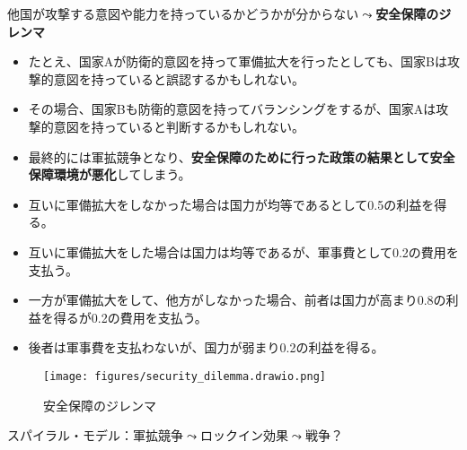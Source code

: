 \documentclass[
  xelatex,
  ja=standard]{bxjsarticle}
\providecommand{\tightlist}{%
  \setlength{\itemsep}{0pt}\setlength{\parskip}{0pt}}\usepackage{longtable,booktabs,array}
\begin{document}
他国が攻撃する意図や能力を持っているかどうかが分からない\(\leadsto\)\textbf{安全保障のジレンマ}\citep{jervis1978}

\begin{itemize}
\tightlist
\item
  たとえ、国家Aが防衛的意図を持って軍備拡大を行ったとしても、国家Bは攻撃的意図を持っていると誤認するかもしれない。
\item
  その場合、国家Bも防衛的意図を持ってバランシングをするが、国家Aは攻撃的意図を持っていると判断するかもしれない。
\item
  最終的には軍拡競争となり、\textbf{安全保障のために行った政策の結果として安全保障環境が悪化}してしまう。
\end{itemize}

\begin{tcolorbox}[enhanced jigsaw, colbacktitle=quarto-callout-tip-color!10!white, breakable, toptitle=1mm, opacitybacktitle=0.6, leftrule=.75mm, bottomrule=.15mm, title=\textcolor{quarto-callout-tip-color}{\faLightbulb}\hspace{0.5em}{安全保障のジレンマ}, titlerule=0mm, bottomtitle=1mm, rightrule=.15mm, arc=.35mm, toprule=.15mm, left=2mm, opacityback=0, coltitle=black, colback=white, colframe=quarto-callout-tip-color-frame]

\begin{itemize}
\tightlist
\item
  互いに軍備拡大をしなかった場合は国力が均等であるとして0.5の利益を得る。
\item
  互いに軍備拡大をした場合は国力は均等であるが、軍事費として0.2の費用を支払う。
\item
  一方が軍備拡大をして、他方がしなかった場合、前者は国力が高まり0.8の利益を得るが0.2の費用を支払う。
\item
  後者は軍事費を支払わないが、国力が弱まり0.2の利益を得る。
\end{itemize}

\end{tcolorbox}

\begin{figure}[htpb]

{\centering \texttt{[image: figures/security\_dilemma.drawio.png]}

}

\caption{安全保障のジレンマ}

\end{figure}

スパイラル・モデル：軍拡競争\(\leadsto\)ロックイン効果\(\leadsto\)戦争？
\end{document}
